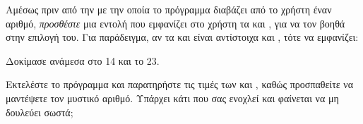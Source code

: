 \documentclass[a4paper,11pt,oneside]{book}
\begin{document}
\begin{step}
Αμέσως πριν από την  με την οποία το πρόγραμμα διαβάζει από το χρήστη έναν αριθμό, \emph{προσθέστε} μια εντολή που εμφανίζει στο χρήστη τα  και , για να τον βοηθά στην επιλογή του. Για παράδειγμα, αν τα  και  είναι αντίστοιχα  και , τότε να εμφανίζει:

\marginnote[24pt]{\iconcomputer}
\begin{pyterm}
Δοκίμασε ανάμεσα στο 14 και το 23.
\end{pyterm}

Εκτελέστε το πρόγραμμα και παρατηρήστε τις τιμές των  και , καθώς προσπαθείτε να μαντέψετε τον μυστικό αριθμό. Υπάρχει κάτι που σας ενοχλεί και φαίνεται να μη δουλεύει σωστά;

\marginnote[14pt]{\icondiscuss}
\dottedline
\end{step}
\end{document}

